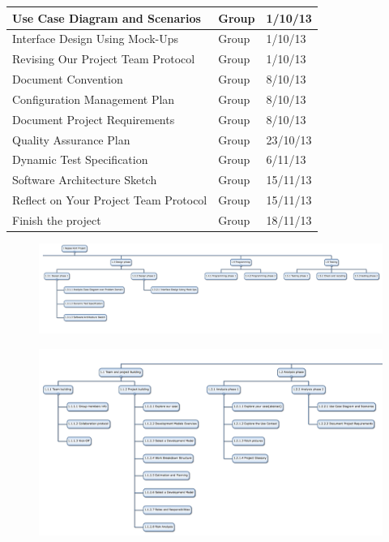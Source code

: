 {\begin{center}
\begin{tabular}{ | p{5cm} | p{3cm} | p{5cm} |}
	Use Case Diagram and Scenarios & Group & 1/10/13 \\ \hline
	Interface Design Using Mock-Ups & Group & 1/10/13 \\ \hline
	Revising Our Project Team Protocol & Group & 1/10/13 \\ \hline
	Document Convention & Group & 8/10/13 \\ \hline
	Configuration Management Plan & Group & 8/10/13 \\ \hline
	Document Project Requirements & Group & 8/10/13 \\ \hline
	Quality Assurance Plan & Group & 23/10/13 \\ \hline
	Dynamic Test Specification & Group & 6/11/13 \\ \hline
	Software Architecture Sketch & Group & 15/11/13 \\ \hline
	Reflect on Your Project Team Protocol & Group & 15/11/13 \\ \hline
	Finish the project & Group & 18/11/13 \\
    \hline
    \end{tabular}
\end{center}
}


\begin{figure}[ht]
\centering
    \includegraphics[width=\textwidth,height=\textheight,keepaspectratio,angle=90]{graphics/Work_Breakdown_Structure_Chart2.jpg}
    \label{fig:PropProf}
\end{figure}


\begin{figure}[ht]
\centering
    \includegraphics[width=\textwidth,height=\textheight,keepaspectratio,angle=90]{graphics/Work_Breakdown_Structure_Chart1.jpg}
    \label{fig:PropProf}
\end{figure}

